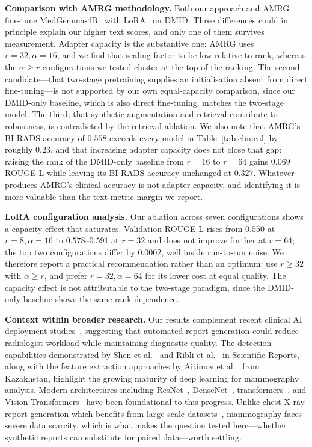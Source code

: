 \documentclass{wlscirep}
\begin{document}
\textbf{Comparison with AMRG methodology.} Both our approach and AMRG~\cite{sung2025} fine-tune MedGemma-4B~\cite{lin2024medgemma} with LoRA~\cite{hu2022lora} on DMID. Three differences could in principle explain our higher text scores, and only one of them survives measurement. Adapter capacity is the substantive one: AMRG uses $r=32,\alpha=16$, and we find that scaling factor to be low relative to rank, whereas the $\alpha \geq r$ configurations we tested cluster at the top of the ranking. The second candidate---that two-stage pretraining supplies an initialisation absent from direct fine-tuning---is not supported by our own equal-capacity comparison, since our DMID-only baseline, which is also direct fine-tuning, matches the two-stage model. The third, that synthetic augmentation and retrieval contribute to robustness, is contradicted by the retrieval ablation. We also note that AMRG's BI-RADS accuracy of $0.558$ exceeds every model in Table~\ref{tab:clinical} by roughly $0.23$, and that increasing adapter capacity does not close that gap: raising the rank of the DMID-only baseline from $r=16$ to $r=64$ gains $0.069$ ROUGE-L while leaving its BI-RADS accuracy unchanged at $0.327$. Whatever produces AMRG's clinical accuracy is not adapter capacity, and identifying it is more valuable than the text-metric margin we report.

\textbf{LoRA configuration analysis.} Our ablation across seven configurations shows a capacity effect that saturates. Validation ROUGE-L rises from $0.550$ at $r=8,\alpha=16$ to $0.578$--$0.591$ at $r=32$ and does not improve further at $r=64$; the top two configurations differ by $0.0002$, well inside run-to-run noise. We therefore report a practical recommendation rather than an optimum: use $r \geq 32$ with $\alpha \geq r$, and prefer $r=32,\alpha=64$ for its lower cost at equal quality. The capacity effect is not attributable to the two-stage paradigm, since the DMID-only baseline shows the same rank dependence.

\textbf{Context within broader research.} Our results complement recent clinical AI deployment studies~\cite{dembrower2020effect, salim2020external, aboutalib2018deep}, suggesting that automated report generation could reduce radiologist workload while maintaining diagnostic quality. The detection capabilities demonstrated by Shen et al.~\cite{shen2019deep} and Ribli et al.~\cite{ribli2018detecting} in Scientific Reports, along with the feature extraction approaches by Aitimov et al.~\cite{aitimov2025feature} from Kazakhstan, highlight the growing maturity of deep learning for mammography analysis. Modern architectures including ResNet~\cite{he2016deep}, DenseNet~\cite{huang2017densely}, transformers~\cite{vaswani2017attention}, and Vision Transformers~\cite{dosovitskiy2021vit} have been foundational to this progress. Unlike chest X-ray report generation which benefits from large-scale datasets~\cite{johnson2019mimiccxr}, mammography faces severe data scarcity, which is what makes the question tested here---whether synthetic reports can substitute for paired data---worth settling.
\end{document}
